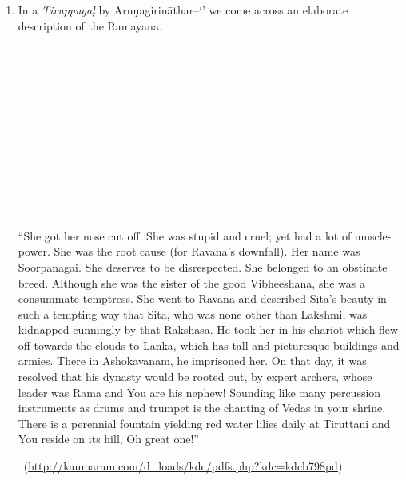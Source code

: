 \begin{enumerate}[{\rm 1.}]
\itemsep=0pt
\item 
 In a \textit{Tiruppugaḷ} by Aruṇagirināthar–‘’ we come across an elaborate description of the Ramayana.

\begin{myquote}
\\\\\\\\\\\\\\\\\\\\\\
\end{myquote}

\begin{myquote}
“She got her nose cut off. She was stupid and cruel; yet had a lot of muscle-power. She was the root cause (for Ravana’s downfall). Her name was Soorpanagai. She deserves to be disrespected. She belonged to an obstinate breed. Although she was the sister of the good Vibheeshana, she was a consummate temptress. She went to Ravana and described Sita’s beauty in such a tempting way that Sita, who was none other than Lakshmi, was kidnapped cunningly by that Rakshasa. He took her in his chariot which flew off towards the clouds to Lanka, which has tall and picturesque buildings and armies. There in Ashokavanam, he imprisoned her. On that day, it was resolved that his dynasty would be rooted out, by expert archers, whose leader was Rama and You are his nephew! Sounding like many percussion instruments as drums and trumpet is the chanting of Vedas in your shrine. There is a perennial fountain yielding red water lilies daily at Tiruttani and You reside on its hill, Oh great one!”

~\hfill (\url{http://kaumaram.com/d_loads/kdc/pdfs.php?kdc=kdcb798pd})
\end{myquote}



\end{enumerate}
